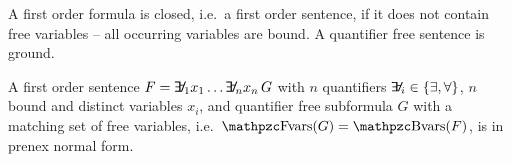 \begin{definition}\label{def:fof:closed}\label{def:fof:sentence}
	A first order formula is closed, i.e.~a first order {\myem sentence}, 
	if it does not contain free variables -- all occurring variables are bound.
	A quantifier free sentence is ground.
\end{definition}

\begin{definition}[\PNF]
	A first order sentence $F = \quantify_1 x_1 \ldots \quantify_n x_n\, G$ 
	with $n$ quantifiers $\quantify_i \in \{\exists,\forall\}$,
	$n$ bound and distinct variables $x_i$, 
	and quantifier free subformula $G$ with 
	a matching set of free variables, i.e.~$\fvar(G) = \bvar(F)$,
	is in {\myem prenex normal form}.
\end{definition}


